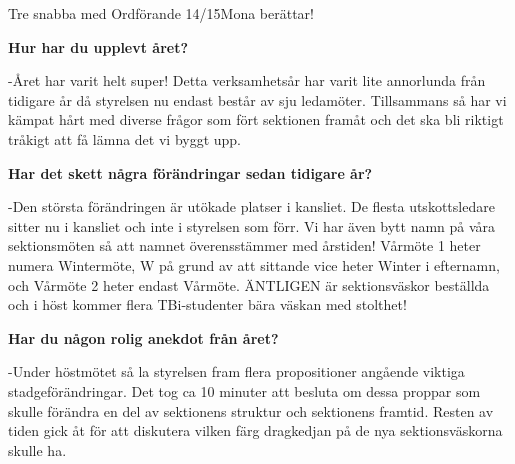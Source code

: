 \begin{news}{4}{Tre snabba med Ordförande 14/15}{Mona berättar!}{}{}

  \noindent \textbf{Hur har du upplevt året?}  
  
  -Året har varit helt super! Detta
  verksamhetsår har varit lite annorlunda från tidigare år då
  styrelsen nu endast består av sju ledamöter. Tillsammans så har vi
  kämpat hårt med diverse frågor som fört sektionen framåt och det ska
  bli riktigt tråkigt att få lämna det vi byggt upp.

  \noindent \textbf{Har det skett några förändringar sedan tidigare år?}  
  
  -Den
  största förändringen är utökade platser i kansliet. De flesta
  utskottsledare sitter nu i kansliet och inte i styrelsen som
  förr. Vi har även bytt namn på våra sektionsmöten så att namnet
  överensstämmer med årstiden!  Vårmöte 1 heter numera Wintermöte, W
  på grund av att sittande vice heter Winter i efternamn, och Vårmöte
  2 heter endast Vårmöte. ÄNTLIGEN är sektionsväskor beställda och i
  höst kommer flera TBi-studenter bära väskan med stolthet!

  \noindent \textbf{Har du någon rolig anekdot från året?}  
  
  -Under höstmötet så
  la styrelsen fram flera propositioner angående viktiga
  stadgeförändringar. Det tog ca 10 minuter att besluta om dessa
  proppar som skulle förändra en del av sektionens struktur och
  sektionens framtid. Resten av tiden gick åt för att diskutera vilken
  färg dragkedjan på de nya sektionsväskorna skulle ha.



\end{news}
